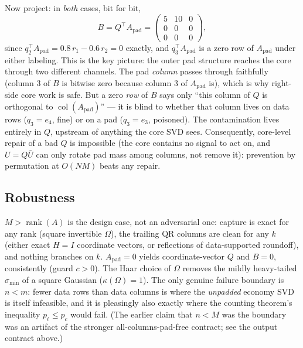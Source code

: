 \documentclass[11pt]{article}
\newcommand{\Apad}{A_{\mathrm{pad}}}
\begin{document}
Now project: in \emph{both} cases, bit for bit,
\[
  B = Q^{\top}\Apad =
  \begin{pmatrix} 5 & 10 & 0\\ 0 & 0 & 0\\ 0 & 0 & 0 \end{pmatrix},
\]
since $q_2^{\top}\Apad = 0.8\,r_1 - 0.6\,r_2 = 0$ exactly, and $q_3^{\top}\Apad$
is a zero row of $\Apad$ under either labeling. This is the key picture: the
outer pad structure reaches the core through two different channels. The pad
\emph{column} passes through faithfully (column 3 of $B$ is bitwise zero
because column 3 of $\Apad$ is), which is why right-side core work is safe.
But a zero \emph{row} of $B$ says only ``this column of $Q$ is orthogonal to
$\operatorname{col}(\Apad)$'' --- it is blind to whether that column lives on
data rows ($q_3 = e_4$, fine) or on a pad ($q_3 = e_3$, poisoned). The
contamination lives entirely in $Q$, upstream of anything the core SVD sees.
Consequently, core-level repair of a bad $Q$ is impossible (the core contains
no signal to act on, and $U = Q\bar U$ can only rotate pad mass among columns,
not remove it): prevention by permutation at $O(NM)$ beats any repair.

\subsection*{Robustness}

$M > \operatorname{rank}(A)$ is the design case, not an adversarial one:
capture is exact for any rank (square invertible $\Omega$), the trailing QR
columns are clean for any $k$ (either exact $H{=}I$ coordinate vectors, or
reflections of data-supported roundoff), and nothing branches on $k$.
$\Apad = 0$ yields coordinate-vector $Q$ and $B = 0$, consistently (guard
$c > 0$). The Haar choice of $\Omega$ removes the mildly heavy-tailed
$\sigma_{\min}$ of a square Gaussian ($\kappa(\Omega) = 1$). The only
genuine failure boundary is $n < m$: fewer data rows than data columns is
where the \emph{unpadded} economy SVD is itself infeasible, and it is
pleasingly also exactly where the counting theorem's inequality
$p_\ell \le p_c$ would fail. (The earlier claim that $n < M$ was the
boundary was an artifact of the stronger all-columns-pad-free contract; see
the output contract above.)
\end{document}
